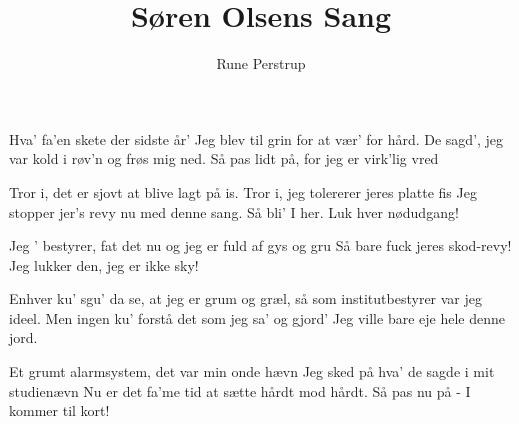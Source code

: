 \documentclass[a4paper,11pt]{article}
\title{Søren Olsens Sang}
\author{Rune Perstrup}
\begin{document}
\twocolumn[
\maketitle
]

\begin{song} 
Hva' fa'en skete der sidste år'
Jeg blev til grin for at vær' for hård.
De sagd', jeg var kold i røv'n og frøs mig ned.
Så pas lidt på,  for jeg er virk'lig vred

Tror i, det er sjovt at blive lagt på is.
Tror i, jeg tolererer jeres platte fis
Jeg stopper jer's revy nu med denne sang.
Så bli' I her. Luk hver nødudgang!

{}
Jeg ' bestyrer, fat det nu
og jeg er fuld af gys og gru
Så bare fuck jeres skod-revy!
Jeg lukker den, jeg er ikke sky!

Enhver ku' sgu' da se, at jeg er grum og græl, så
som institutbestyrer var jeg ideel.
Men ingen ku' forstå det som jeg sa' og gjord'
Jeg ville bare eje hele denne jord.

Et grumt alarmsystem, det var min onde hævn
Jeg sked på hva' de sagde i mit studienævn
Nu er det fa'me tid at sætte hårdt mod hårdt.
Så pas nu på - I kommer til kort!

{}
\end{song}
\end{document}
